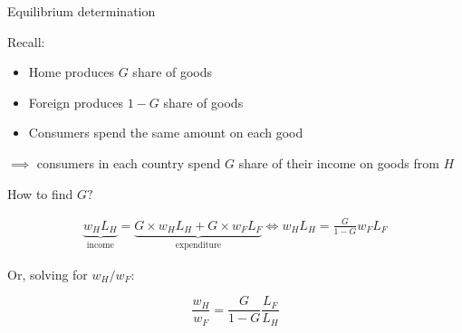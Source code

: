 \documentclass[notes,11pt, aspectratio=169, xcolor=table]{beamer}
\newenvironment{wideitemize}{\itemize\addtolength{\itemsep}{10pt}}{\enditemize}
\begin{document}
\begin{frame}{Equilibrium determination}
\begin{wideitemize}
    \item Recall:
    \begin{itemize}
        \item Home produces $G$ share of goods
        \item Foreign produces $1-G$ share of goods
        \item Consumers spend the same amount on each good
    \end{itemize}

    \item $\implies$ consumers in each country spend $G$ share of their income on goods from $H$

    \item How to find $G?$ 

    \begin{eqnarray*}
        \underbrace{w_HL_H}_{\text{income}} = \underbrace{G\times w_HL_H + G\times w_FL_F}_{\text{expenditure}} \iff w_HL_H = \frac{G}{1-G}w_FL_F
    \end{eqnarray*}

    \item Or, solving for $w_H / w_F$:

    \begin{equation*}
        \frac{w_H}{w_F} =  \frac{G}{1-G} \frac{L_F}{L_H}
    \end{equation*}
    
    \end{wideitemize}
\end{frame}
\end{document}
